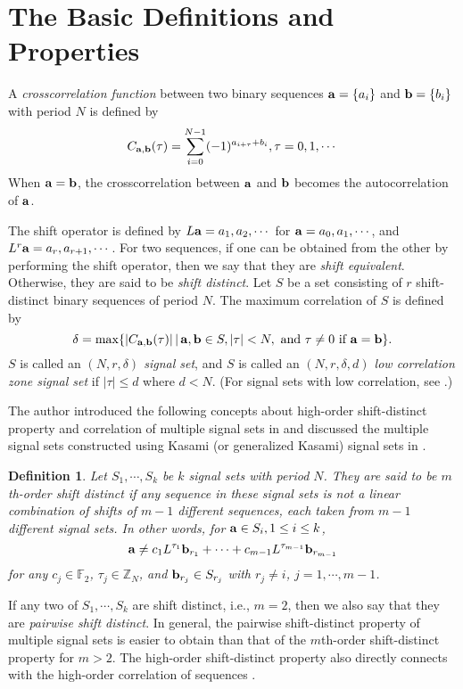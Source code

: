 \documentclass{article}
\newtheorem{definition}{Definition}
\newcommand{\F}{\ensuremath{\mathbb F}}
\newcommand{\Z}{\ensuremath{\mathbb Z}}
\newcommand{\abu}{{\bf{a}}}
\newcommand{\bbu}{{\bf{b}}}
\begin{document}
 \section{ The Basic Definitions and Properties }
A {\em crosscorrelation function} between two   binary
sequences $\abu=\{a_i\}$ and  $\bbu=\{b_i\}$ with 
period $N$ is  defined by
\[
C_{\abu, \bbu}(\tau)=\sum_{i=0}^{N-1} (-1)^{a_{i+\tau}+b_i},
\tau=0, 1, \cdots
\]
When $\abu=\bbu$, the crosscorrelation between $\abu$ and $\bbu$
becomes the autocorrelation of $\abu$. 

The shift operator is defined by $L\abu=a_1, a_{2},
\cdots$ for $\abu=a_0, a_1, \cdots$, and $L^r\abu=a_r, a_{r+1},
\cdots$.  For two sequences,
if one can be obtained from the other by performing the shift
operator, then we say that they are {\em shift equivalent}.
Otherwise, they are said to be {\em shift distinct}. Let $S$ be a set consisting of $r$ shift-distinct binary sequences of period $N$. The maximum correlation of $S$ is defined by
\[
\delta = \max\{|C_{\abu, \bbu}(\tau)| \,|\, \abu, \bbu \in S,   | \tau| < N, \mbox{ and } \tau\not = 0 \mbox{ if } \abu=\bbu\}.
\]
$S$ is called an {\em $(N, r, \delta)$ signal set}, and  $S$ is called  an {\em $(N, r, \delta, d)$ low correlation zone signal set} if  $|\tau| \le d$ where $d<N$. (For signal sets with low correlation, see \cite{KumarHelleseth}.)


The author introduced the following concepts about high-order shift-distinct property and correlation of  multiple signal sets  in \cite{GongAMS} and discussed  the multiple signal sets constructed using  Kasami (or generalized Kasami) signal sets in \cite{gong-isit07}. 
\begin{definition}
Let  $ S_1, \cdots, S_k$  be $k$ signal sets with period $N$.   They are said to be {\em $m$th-order shift distinct}  
if any sequence in  these signal sets  is not a linear combination of
shifts of   $m-1$ different sequences, each taken from  $m-1$ different  signal sets.  In other words, for $\abu\in S_i,
1\le i\le k$,
\[
\abu\ne c_1L^{\tau_1}\bbu_{r_1}+\cdots+
c_{m-1}L^{\tau_{m-1}}\bbu_{r_{m-1}}
\]
 for any $c_j\in \F_2$, $\tau_j\in \Z_{N}$, and $\bbu_{r_j}\in S_{r_j}$ with
  $r_j\ne i$, $j=1, \cdots, m-1$.
\end{definition}

If any two
of   $S_1, \cdots, S_k$  are shift distinct, i.e., $m=2$, then we also say that they 
are {\em pairwise shift distinct}. In general, the pairwise shift-distinct property of multiple 
signal sets is easier to obtain  than that of the $m$th-order
shift-distinct property for $m>2$.  The high-order shift-distinct property also directly connects with the high-order correlation of sequences \cite{NamGong}. 
\end{document}
